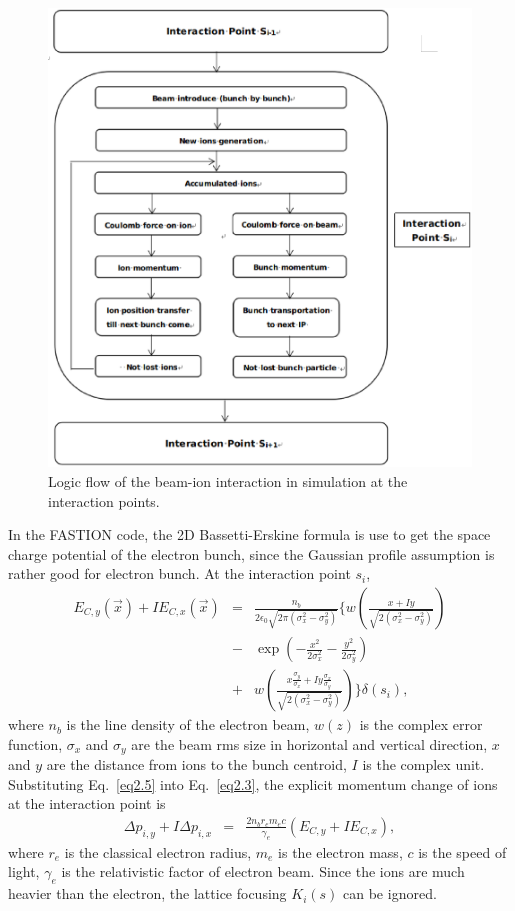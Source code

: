 \documentclass[aps,prab,reprint,superscriptaddress,showpacs,showkeys,letter]{revtex4-1}
\begin{document}
\begin{figure}[t]
\centering
\includegraphics[width=1\linewidth]{Fig1.eps}
\caption{Logic flow of the beam-ion interaction in simulation at the interaction points. }
\label{fig:fig1}
\end{figure}

In the FASTION code, the 2D Bassetti-Erskine formula is use to get the space charge potential of the  electron bunch, since the Gaussian profile assumption is rather good for electron bunch. At the interaction point $s_i$, 
\begin{eqnarray}
\label{eq2.5}
E_{C,y}( \vec  x ) + I E_{C, x}(\vec x) &=& \frac{n_b}{2\epsilon_0\sqrt{2\pi (\sigma_x^2-\sigma_y^2)}} 
\{w(\frac{x+Iy}{\sqrt{2(\sigma_x^2-\sigma_y^2)}}) \nonumber  \\
&-&\exp(-\frac{x^2}{2\sigma_x^2}-\frac{y^2}{2\sigma_y^2}) \nonumber  \\
 &+& w(\frac{x\frac{\sigma_y}{\sigma_x}+Iy\frac{\sigma_x}{\sigma_y}}{\sqrt{2 (\sigma_x^2-\sigma_y^2)}}) \} \delta(s_i), 
\end{eqnarray}
where $n_b$ is the line density of the electron beam, $w(z)$ is the complex error function, $\sigma_x$ and $\sigma_y$ are the beam rms size in horizontal and vertical direction, $x$ and $y$ are the distance from ions to the bunch centroid, $I$ is the complex unit. Substituting Eq.~\ref{eq2.5} into Eq.~\ref{eq2.3}, the explicit momentum change of ions at the interaction point is 
\begin{eqnarray}
\label{eq2.6}
\Delta p_{i,y} + I \Delta p_{i,x} &=& \frac{2 n_br_em_ec}{\gamma_e} (E_{C,y} + I E_{C, x}), 
\end{eqnarray}
where $r_e$ is the classical electron radius, $m_e$ is the electron mass, $c$ is the speed of light, $\gamma_e$ is the relativistic factor of electron beam. Since the ions are much heavier than the electron, the lattice focusing $K_i(s)$ can be ignored. 
\end{document}
